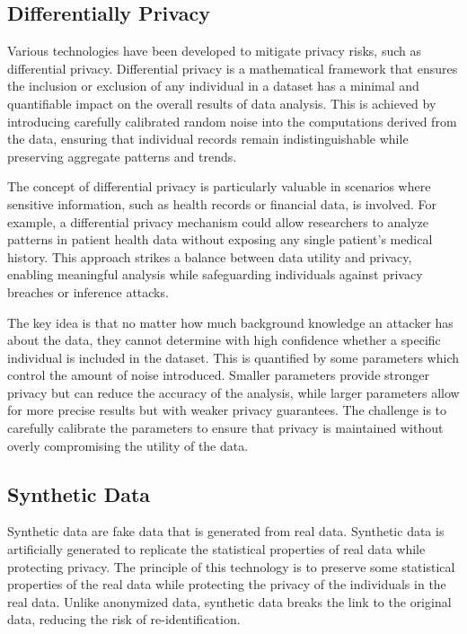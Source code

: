 \documentclass[manuscript,screen,review,anonymous]{acmart}
\begin{document}
\subsection{Differentially Privacy}

Various technologies have been developed to mitigate privacy risks, such as differential privacy. Differential privacy is a mathematical framework that ensures the inclusion or exclusion of any individual in a dataset has a minimal and quantifiable impact on the overall results of data analysis. This is achieved by introducing carefully calibrated random noise into the computations derived from the data, ensuring that individual records remain indistinguishable while preserving aggregate patterns and trends.

The concept of differential privacy is particularly valuable in scenarios where sensitive information, such as health records or financial data, is involved. For example, a differential privacy mechanism could allow researchers to analyze patterns in patient health data without exposing any single patient's medical history. This approach strikes a balance between data utility and privacy, enabling meaningful analysis while safeguarding individuals against privacy breaches or inference attacks.

The key idea is that no matter how much background knowledge an attacker has about the data, they cannot determine with high confidence whether a specific individual is included in the dataset. This is quantified by some parameters which control the amount of noise introduced. Smaller parameters provide stronger privacy but can reduce the accuracy of the analysis, while larger parameters allow for more precise results but with weaker privacy guarantees. The challenge is to carefully calibrate the parameters to ensure that privacy is maintained without overly compromising the utility of the data.

\subsection{Synthetic Data}

Synthetic data are fake data that is generated from real data. Synthetic data is artificially generated to replicate the statistical properties of real data while protecting privacy. The principle of this technology is to preserve some statistical properties of the real data while protecting the privacy of the individuals in the real data. Unlike anonymized data, synthetic data breaks the link to the original data, reducing the risk of re-identification.
\end{document}
